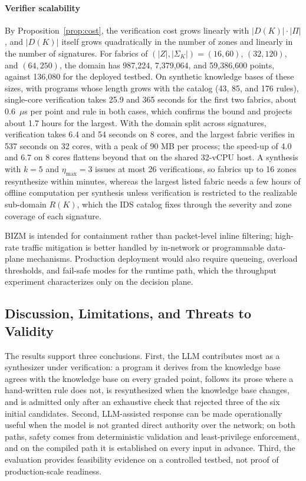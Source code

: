 \documentclass[final,5p]{elsarticle}
\begin{document}
\paragraph{Verifier scalability}
By Proposition~\ref{prop:cost}, the verification cost grows linearly with $|D(K)|\cdot|\Pi|$, and $|D(K)|$ itself grows quadratically in the number of zones and linearly in the number of signatures. For fabrics of $(|Z|,|\Sigma_K|)=(16,60)$, $(32,120)$, and $(64,250)$, the domain has 987,224, 7,379,064, and 59,386,600 points, against 136,080 for the deployed testbed. On synthetic knowledge bases of these sizes, with programs whose length grows with the catalog (43, 85, and 176 rules), single-core verification takes 25.9 and 365 seconds for the first two fabrics, about 0.6~$\mu$s per point and rule in both cases, which confirms the bound and projects about 1.7 hours for the largest. With the domain split across signatures, verification takes 6.4 and 54 seconds on 8 cores, and the largest fabric verifies in 537 seconds on 32 cores, with a peak of 90 MB per process; the speed-up of 4.0 and 6.7 on 8 cores flattens beyond that on the shared 32-vCPU host. A synthesis with $k=5$ and $\eta_{\max}=3$ issues at most 26 verifications, so fabrics up to 16 zones resynthesize within minutes, whereas the largest listed fabric needs a few hours of offline computation per synthesis unless verification is restricted to the realizable sub-domain $R(K)$, which the IDS catalog fixes through the severity and zone coverage of each signature.

BIZM is intended for containment rather than packet-level inline filtering; high-rate traffic mitigation is better handled by in-network or programmable data-plane mechanisms. Production deployment would also require queueing, overload thresholds, and fail-safe modes for the runtime path, which the throughput experiment characterizes only on the decision plane.

\subsection{Discussion, Limitations, and Threats to Validity}
\label{sec:discussion_validity}

The results support three conclusions. First, the LLM contributes most as a synthesizer under verification: a program it derives from the knowledge base agrees with the knowledge base on every graded point, follows its prose where a hand-written rule does not, is resynthesized when the knowledge base changes, and is admitted only after an exhaustive check that rejected three of the six initial candidates. Second, LLM-assisted response can be made operationally useful when the model is not granted direct authority over the network; on both paths, safety comes from deterministic validation and least-privilege enforcement, and on the compiled path it is established on every input in advance. Third, the evaluation provides feasibility evidence on a controlled testbed, not proof of production-scale readiness.
\end{document}
